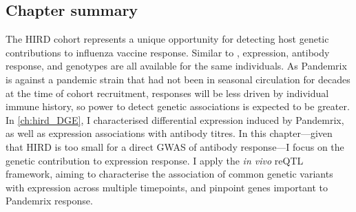 \subsection{Chapter summary}

The \gls{HIRD} cohort represents a unique opportunity for detecting host genetic contributions to influenza vaccine response.
Similar to \textcite{franco2013IntegrativeGenomicAnalysis},
expression, antibody response, and genotypes are all available for the same individuals.
As Pandemrix is against a pandemic strain that had not been in seasonal circulation for decades at the time of cohort recruitment, 
responses will be less driven by individual immune history,
so power to detect genetic associations is expected to be greater.
In \cref{ch:hird_DGE}, I characterised differential expression induced by Pandemrix, as well as expression associations with antibody titres.
In this chapter---given that \gls{HIRD} is too small for a direct \gls{GWAS} of antibody response---I focus on the genetic contribution to expression response.
I apply the \textit{in vivo} \gls{reQTL} framework, 
aiming to characterise the association of common genetic variants with expression across multiple timepoints,
and pinpoint genes important to Pandemrix response.

